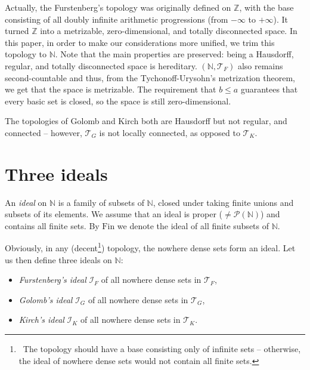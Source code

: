 \documentclass{amsart}
\theoremstyle{definition}
\theoremstyle{definition}
\newcommand{\N}{{\mathbb N}}
\newcommand{\Z}{{\mathbb Z}}
\newcommand{\Fin}{\textrm{Fin}}
\newcommand{\I}{\mathcal I}
\newcommand{\T}{\mathcal{T}}
\begin{document}

Actually, the Furstenberg's topology was originally defined on $\Z$, with the base consisting of all doubly infinite arithmetic progressions (from $-\infty$ to $+\infty$). It turned $\Z$ into a metrizable, zero-dimensional, and totally disconnected space. In this paper, in order to make our considerations more unified, we trim this topology to $\N$. Note that the main properties are preserved: being a Hausdorff, regular, and totally disconnected space is hereditary. $(\N,\T_F)$ also remains second-countable and thus, from the Tychonoff-Urysohn's metrization theorem, we get that the space is metrizable. The requirement that $b\leq a$ guarantees that every basic set is closed, so the space is still zero-dimensional.

The topologies of Golomb and Kirch both are Hausdorff but not regular, and connected -- however, $\T_G$ is not locally connected, as opposed to $\T_K$.


\section*{Three ideals}

An \emph{ideal} on $\N$ is a family of subsets of $\N$, closed under taking finite unions and subsets of its elements. We assume that an ideal is proper ($\neq \mathcal{P}(\N)$) and contains all finite sets. By $\Fin$ we denote the ideal of all finite subsets of $\N$.


Obviously, in any (decent\footnote{\ The topology should have a base consisting only of infinite sets -- otherwise, the ideal of nowhere dense sets would not contain all finite sets.}) topology, the nowhere dense sets form an ideal. Let us then define three ideals on $\N$:
\begin{itemize}
\item \emph{Furstenberg's ideal} $\I_F$ of all nowhere dense sets in $\T_F$,
\item \emph{Golomb's ideal} $\I_G$ of all nowhere dense sets in $\T_G$,
\item \emph{Kirch's ideal} $\I_K$ of all nowhere dense sets in $\T_K$.
\end{itemize}
\end{document}
